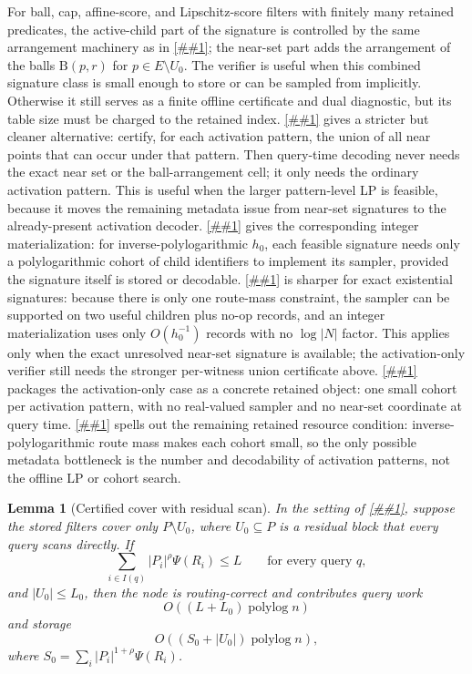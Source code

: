 \documentclass[10pt]{article}
\newcommand{\cref}[1]{\ref{##1}}
\newcommand{\Cref}[1]{\ref{##1}}
\newtheorem{lemma}[theorem]{Lemma}
\theoremstyle{definition}
\newcommand{\Ball}{\mathrm{B}}
\newcommand{\polylog}{\operatorname{polylog}}
\begin{document}
For ball, cap, affine-score, and Lipschitz-score filters with finitely many
retained predicates, the active-child part of the signature is controlled by
the same arrangement machinery as in \cref{lem:finite-activation-patterns}; the
near-set part adds the arrangement of the balls $\Ball(p,r)$ for
$p\in E\setminus U_0$.  The verifier is useful when this combined signature
class is small enough to store or can be sampled from implicitly.  Otherwise it
still serves as a finite offline certificate and dual diagnostic, but its table
size must be charged to the retained index.
\Cref{lem:activation-sampled-route-verifier} gives a stricter but cleaner
alternative: certify, for each activation pattern, the union of all near points
that can occur under that pattern.  Then query-time decoding never needs the
exact near set or the ball-arrangement cell; it only needs the ordinary
activation pattern.  This is useful when the larger pattern-level LP is
feasible, because it moves the remaining metadata issue from near-set
signatures to the already-present activation decoder.
\Cref{lem:sampled-route-cohort} gives the corresponding integer
materialization: for inverse-polylogarithmic \(h_0\), each feasible signature
needs only a polylogarithmic cohort of child identifiers to implement its
sampler, provided the signature itself is stored or decodable.
\Cref{lem:two-child-existential-sampler} is sharper for exact existential
signatures: because there is only one route-mass constraint, the sampler can
be supported on two useful children plus no-op records, and an integer
materialization uses only \(O(h_0^{-1})\) records with no \(\log |N|\) factor.
This applies only when the exact unresolved near-set signature is available;
the activation-only verifier still needs the stronger per-witness union
certificate above.
\Cref{lem:activation-cohort-sampled-compiler} packages the activation-only
case as a concrete retained object: one small cohort per activation pattern,
with no real-valued sampler and no near-set coordinate at query time.
\Cref{cor:activation-cohort-resources} spells out the remaining retained
resource condition: inverse-polylogarithmic route mass makes each cohort small,
so the only possible metadata bottleneck is the number and decodability of
activation patterns, not the offline LP or cohort search.

\begin{lemma}[Certified cover with residual scan]\label{lem:cover-residual-scan}
   In the setting of \cref{lem:certified-cover-compiler}, suppose the stored
   filters cover only $P\setminus U_0$, where $U_0\subseteq P$ is a residual
   block that every query scans directly.  If
   \[
      \sum_{i\in I(q)} |P_i|^\rho\Psi(R_i)\le L
      \qquad\text{for every query }q,
   \]
   and $|U_0|\le L_0$, then the node is routing-correct and contributes query
   work
   \[
      O((L+L_0)\polylog n)
   \]
   and storage
   \[
      O((S_0+|U_0|)\polylog n),
   \]
   where $S_0=\sum_i |P_i|^{1+\rho}\Psi(R_i)$.
\end{lemma}
\end{document}
